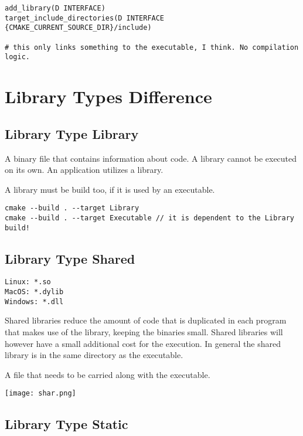 \begin{verbatim}
add_library(D INTERFACE)
target_include_directories(D INTERFACE {CMAKE_CURRENT_SOURCE_DIR}/include)

# this only links something to the executable, I think. No compilation logic.
\end{verbatim}


\section{Library Types Difference}

\subsection{Library Type Library}

A binary file that contains information about code.
A library cannot be executed on its own.
An application utilizes a library.

A library must be build too, if it is used by an executable.

\begin{verbatim}
cmake --build . --target Library
cmake --build . --target Executable // it is dependent to the Library build!
\end{verbatim}

\subsection{Library Type Shared}

\begin{verbatim}
Linux: *.so
MacOS: *.dylib
Windows: *.dll
\end{verbatim}

Shared libraries reduce the amount of code that is duplicated in each program that makes use of the library, keeping the binaries small.
Shared libraries will however have a small additional cost for the execution.
In general the shared library is in the same directory as the executable.

A file that needs to be carried along with the executable.

\begin{center}
    \texttt{[image: shar.png]}
\end{center}


\subsection{Library Type Static}

